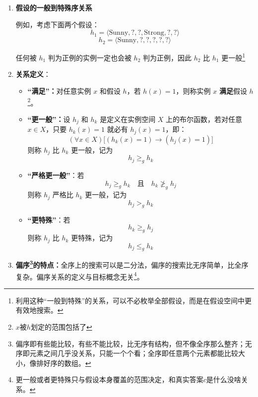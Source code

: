 \documentclass[../main.tex]{subfiles}
\begin{document}
\begin{enumerate}
{\begin{itemize}
\[        \]
        即共有 96 种不同实例。
        \item 对于假设空间 $H$，每个属性的约束可以取“具体属性值”“?” 或 “$\phi$”。
        \item 因此语法形式上共有
        \[
            |H| = 5 \times 4 \times 4 \times 4 \times 4 \times 4 = 5120
        \]
        种假设。
        \item 但从语义上看，只要假设中某一位出现 $\phi$，该假设就不会接受任何实例，因此所有包含 $\phi$ 的假设在语义上等价于“把所有实例都判为反例”。
        \item 所以语义不同的假设总数为
        \[
            1 + 4 \times 3 \times 3 \times 3 \times 3 \times 3 = 973
        \]
        其中前面的 $1$ 表示“所有实例都判为反例”的那一类假设。
    \end{itemize}    
    }
    
    \item \textbf{假设的一般到特殊序关系}
    
    {\small\kaishu
    例如，考虑下面两个假设：
        \[
            h_1 = \langle \text{Sunny}, ?, ?, \text{Strong}, ?, ? \rangle
        \]
        \[
            h_2 = \langle \text{Sunny}, ?, ?, ?, ?, ? \rangle
        \]
    
    任何被 $h_1$ 判为正例的实例一定也会被 $h_2$ 判为正例，因此 $h_2$ 比 $h_1$ 更一般\footnote{利用这种“一般到特殊”的关系，可以不必枚举全部假设，而是在假设空间中更有效地搜索。}
    }
    \item \textbf{关系定义}：
    \begin{itemize}
         \item \textbf{“满足”：}对任意实例 $x$ 和假设 $h$，若 $h(x)=1$，则称实例 $x$ \textbf{满足}假设 $h$ \footnote{$x$被$h$划定的范围包括了}。
        \item \textbf{“更一般”：}设 $h_j$ 和 $h_k$ 是定义在实例空间 $X$ 上的布尔函数，若对任意 $x \in X$，只要 $h_k(x)=1$ 就必有 $h_j(x)=1$，即：
            \[
                (\forall x \in X)\bigl[(h_k(x)=1)\rightarrow(h_j(x)=1)\bigr]
            \]
            则称 $h_j$ 比 $h_k$ 更一般，记为
            \[
                h_j \geq_g h_k
            \]
        \item \textbf{“严格更一般”}：若
            \[
                h_j \geq_g h_k \quad \text{且} \quad h_k \not\geq_g h_j
            \]
            则称 $h_j$ 严格比 $h_k$ 更一般，记为
            \[
                h_j >_g h_k
            \]
        \item \textbf{“更特殊”}：若
            \[
                h_k \geq_g h_j
            \]
            则称 $h_j$ 比 $h_k$ 更特殊，记为
            \[
                h_j \leq_g h_k
            \]
    \end{itemize}
    \item \textbf{偏序\footnote{偏序即有些能比较，有些不能比较，比无序有结构，但不像全序那么整齐；无序即元素之间几乎没关系，只能一个个看；全序即任意两个元素都能比较大小，像排好序的数组。}的特点：}全序上的搜索可以是二分法，偏序的搜索比无序简单，比全序复杂。偏序关系的定义与目标概念无关\footnote{更一般或者更特殊只与假设本身覆盖的范围决定，和真实答案$c$是什么没啥关系。}。

\end{enumerate}
\end{document}
